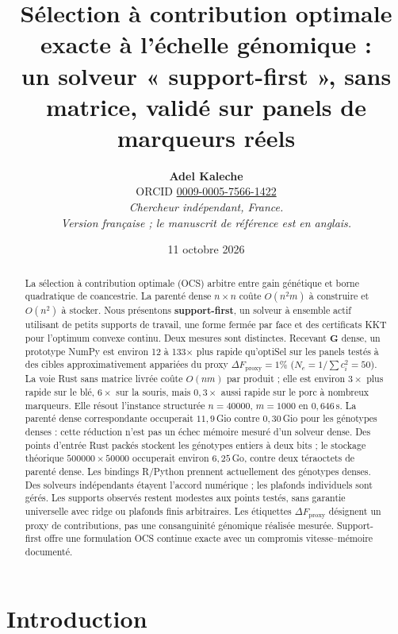 \documentclass[11pt]{article}
\title{\bfseries Sélection à contribution optimale exacte à l'échelle génomique :\\ un solveur « support-first », sans matrice, validé sur panels de marqueurs réels}
\author{\textbf{Adel Kaleche}\\[2pt]
  \small ORCID \href{https://orcid.org/0009-0005-7566-1422}{0009-0005-7566-1422}\\[2pt]
  \small\itshape Chercheur indépendant, France. \\ \small\itshape Version française ; le manuscrit de référence est en anglais.}
\date{11 octobre 2026}
\newcommand{\bG}{\mathbf{G}}
\begin{document}
\maketitle

\begin{abstract}
\noindent
La sélection à contribution optimale (OCS) arbitre entre gain génétique et borne quadratique de coancestrie. La parenté dense $n\times n$ coûte $O(n^2m)$ à construire et $O(n^2)$ à stocker. Nous présentons \textbf{support-first}, un solveur à ensemble actif utilisant de petits supports de travail, une forme fermée par face et des certificats KKT pour l'optimum convexe continu. Deux mesures sont distinctes. Recevant $\bG$ dense, un prototype NumPy est environ 12 à 133$\times$ plus rapide qu'optiSel sur les panels testés à des cibles approximativement appariées du proxy $\Delta F_{\mathrm{proxy}}=1\%$ ($N_e=1/\sum c_i^2=50$). La voie Rust sans matrice livrée coûte $O(nm)$ par produit ; elle est environ $3\times$ plus rapide sur le blé, $6\times$ sur la souris, mais $0{,}3\times$ aussi rapide sur le porc à nombreux marqueurs. Elle résout l'instance structurée $n=40000$, $m=1000$ en $0{,}646$\,s. La parenté dense correspondante occuperait $11{,}9$\,Gio contre $0{,}30$\,Gio pour les génotypes denses : cette réduction n'est pas un échec mémoire mesuré d'un solveur dense. Des points d'entrée Rust packés stockent les génotypes entiers à deux bits ; le stockage théorique $500000\times50000$ occuperait environ $6{,}25$\,Go, contre deux téraoctets de parenté dense. Les bindings R/Python prennent actuellement des génotypes denses. Des solveurs indépendants étayent l'accord numérique ; les plafonds individuels sont gérés. Les supports observés restent modestes aux points testés, sans garantie universelle avec ridge ou plafonds finis arbitraires. Les étiquettes $\Delta F_{\mathrm{proxy}}$ désignent un proxy de contributions, pas une consanguinité génomique réalisée mesurée. Support-first offre une formulation OCS continue exacte avec un compromis vitesse--mémoire documenté.
\end{abstract}

\section{Introduction}
\end{document}
